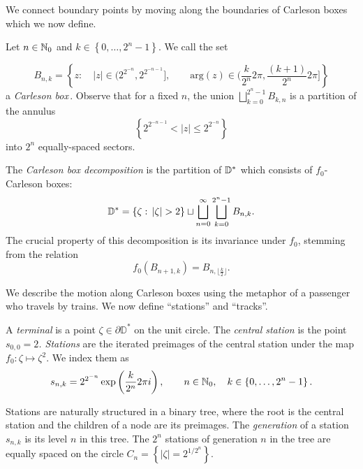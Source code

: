 We connect boundary points by moving along the boundaries of Carleson boxes which we now define.
\begin{definition}
Let $n\in\mathbb{N}_{0}$ and $k\in\left\{ 0,\ldots,2^{n}-1\right\} $. We
call the set

\[
B_{n,k}=\left\{ z:\quad\left|z\right|\in\biggl(2^{2^{-n}},2^{2^{-n-1}}\biggl],\qquad\mathrm{arg}(z)\in\biggl(\frac{k}{2^{n}}2\pi,\frac{(k+1)}{2^{n}}2\pi\biggl]\right\} 
\]
a \emph{Carleson box}\,.
Observe that for a fixed $n$, the union $\bigsqcup_{k=0}^{2^{n}-1}B_{k,n}$
is a partition of the annulus 
\[
\left\{ 2^{2^{-n-1}}<\left|z\right|\leq2^{2^{-n}}\right\} 
\]
 into $2^{n}$ equally-spaced sectors.
 
The \emph{Carleson box decomposition} is the partition of $\mathbb{D}^{*}$ which consists of $f_{0}$-Carleson
boxes:
\[
\D^{*}=\left\{ \zeta:\,\left|\zeta\right|>2\right\} \sqcup\bigsqcup_{n=0}^{\infty}\bigsqcup_{k=0}^{2^{n}-1}B_{n,k}.
\]
The crucial property of this decomposition is its invariance under $f_{0}$,
stemming from the relation
\begin{equation*}
f_{0}\left(B_{n+1,k}\right)=B_{n,\lfloor\frac{k}{2}\rfloor}.
\end{equation*}
\end{definition}

We describe the motion along Carleson boxes using the metaphor of a passenger who travels by trains. 
We now define \enquote{stations} and \enquote{tracks}.

\begin{definition}
A \emph{terminal} is a point $\zeta \in \partial \mathbb D^*$ on the unit circle.
The \emph{central station} is the point\emph{ $s_{0,0}=2$. Stations
}are the iterated preimages of the central station under the map $f_{0}:\zeta\mapsto \zeta^{2}$.
We index them as 
\[
s_{n,k}=2^{2^{-n}}\exp\left(\frac{k}{2^{n}}2\pi i\right),\qquad n\in\mathbb{N}_{0},\quad k\in\left\{ 0,\ldots,2^{n}-1\right\} .
\]

Stations are naturally structured in a binary tree, where the root is the central station and the children of a node are its preimages. The \emph{generation} of a station $s_{n,k}$ is its level $n$ in this tree. The $2^{n}$ stations of generation $n$ in the tree are equally spaced on the circle $C_{n}=\left\{ \left|\zeta\right|=2^{1/2^{n}}\right\} $. 
\end{definition}

